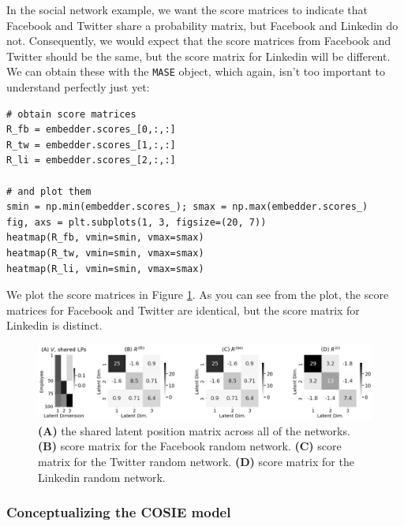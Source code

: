 In the social network example, we want the score matrices to indicate that Facebook and Twitter share a probability matrix, but Facebook and Linkedin do not. Consequently, we would expect that the score matrices from Facebook and Twitter should be the same, but the score matrix for Linkedin will be different. We can obtain these with the \texttt{MASE} object, which again, isn't too important to understand perfectly just yet:

\begin{lstlisting}[style=python]
# obtain score matrices
R_fb = embedder.scores_[0,:,:]
R_tw = embedder.scores_[1,:,:]
R_li = embedder.scores_[2,:,:]

# and plot them
smin = np.min(embedder.scores_); smax = np.max(embedder.scores_)
fig, axs = plt.subplots(1, 3, figsize=(20, 7))
heatmap(R_fb, vmin=smin, vmax=smax)
heatmap(R_tw, vmin=smin, vmax=smax)
heatmap(R_li, vmin=smin, vmax=smax)
\end{lstlisting}
We plot the score matrices in Figure \ref{fig:ch5:scores}. As you can see from the plot, the score matrices for Facebook and Twitter are identical, but the score matrix for Linkedin is distinct.

\begin{figure}
    \centering
    \includegraphics[width=\linewidth]{representations/ch5/Images/scores.png}
    \caption[Score matrices for COSIE model]{\textbf{(A)} the shared latent position matrix across all of the networks. \textbf{(B)} score matrix for the Facebook random network. \textbf{(C)} score matrix for the Twitter random network. \textbf{(D)} score matrix for the Linkedin random network.}
    \label{fig:ch5:scores}
\end{figure}

\subsubsection{Conceptualizing the COSIE model}

